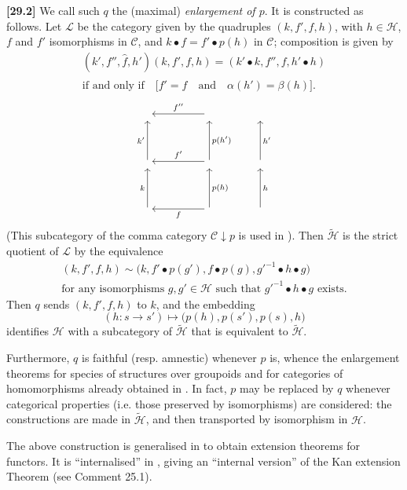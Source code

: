\documentclass[a4paper,fleqn]{article}
\theoremstyle{plain}
\theoremstyle{definition}
\newenvironment{longcomm}[1]
  {\noindent\textbf{[#1]}\rmfamily}
  {}
\newcommand{\textand}{\quad\text{and}\quad}
\newcommand{\CC}{\mathcal{C}}
\newcommand{\HH}{\mathcal{H}}
\begin{document}
\begin{longcomm}{29.2}
  We call such $q$ the (maximal) \emph{enlargement of $p$}.
  It is constructed as follows.
  Let $\mathcal{L}$ be the category given by the quadruples $(k,f',f,h)$, with $h\in\HH$, $f$ and $f'$ isomorphisms in $\CC$, and $k\bullet f=f'\bullet p(h)$ in $\CC$; composition is given by
  \[
    \begin{gathered}
      (k',f'',\hat{f},h')(k,f',f,h)
      = (k'\bullet k, f'', f, h'\bullet h)
    \\\text{if and only if}\quad
      \big[f'=\hat{f}
      \textand
      \alpha(h')=\beta(h)\big].
    \end{gathered}
  \]
  \[
    \begin{tikzcd}[sep=huge]
      {}
      &{} \ar[l,swap,"f''"]
    \\{} \ar[u,"k'"]
      &{} \ar[l,swap,"f'"] \ar[u,swap,"p(h')"]
    \\{} \ar[u,"k"]
      &{} \ar[l,"f"] \ar[u,swap,"p(h)"]
    \end{tikzcd}
    \qquad
    \begin{tikzcd}[sep=huge]
      {}
    \\{} \ar[u,swap,"h'"]
    \\{} \ar[u,swap,"h"]
    \end{tikzcd}
  \]
  (This subcategory of the comma category $\CC\downarrow p$ is used in \cite[Section~1]{coll100}).
  Then $\widetilde{\HH}$ is the strict quotient of $\mathcal{L}$ by the equivalence
  \[
    \begin{gathered}
      (k,f',f,h)
      \sim \big(
        k, f'\bullet p(g'), f\bullet p(g), {g'}^{-1}\bullet h\bullet g
      \big)
    \\\text{for any isomorphisms $g,g'\in\HH$ such that ${g'}^{-1}\bullet h\bullet g$ exists.}
    \end{gathered}
  \]
  Then $q$ sends $(k,f',f,h)$ to $k$, and the embedding
  \[
    (h\colon s\to s')
    \mapsto \big(
      p(h), p(s'), p(s), h
    \big)
  \]
  identifies $\HH$ with a subcategory of $\widetilde{\HH}$ that is equivalent to $\widetilde{\HH}$.

  Furthermore, $q$ is faithful (resp. amnestic) whenever $p$ is, whence the enlargement theorems for species of structures over groupoids and for categories of homomorphisms already obtained in \cite{coll47}.
  In fact, $p$ may be replaced by $q$ whenever categorical properties (i.e. those preserved by isomorphisms) are considered: the constructions are made in $\widetilde{\HH}$, and then transported by isomorphism in $\HH$.

  The above construction is generalised in \cite{coll77,coll122} to obtain extension theorems for functors.
  It is ``internalised'' in \cite{coll89,coll90,coll95,coll96}, giving an ``internal version'' of the Kan extension Theorem (see Comment 25.1).
\end{longcomm}
\end{document}
